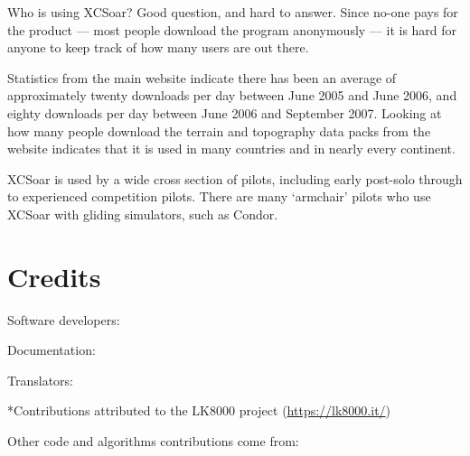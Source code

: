 Who is using XCSoar?  Good question, and hard to answer.  Since no-one
pays for the product --- most people download the program anonymously
--- it is hard for anyone to keep track of how many users are out
there.

Statistics from the main website indicate there has been an average of
approximately twenty downloads per day between June 2005 and June
2006, and eighty downloads per day between June 2006 and September
2007.  Looking at how many people download the terrain and topography
data packs from the website indicates that it is used in many
countries and in nearly every continent.

XCSoar is used by a wide cross section of pilots, including early
post-solo through to experienced competition pilots.  There are many
`armchair' pilots who use XCSoar with gliding simulators, such as
Condor.


\section{Credits}\label{sec:credits}

Software developers:
\begin{itemize}
  
\end{itemize}


Documentation:
\begin{itemize}
  
\end{itemize}


Translators:
\begin{itemize}
  
\end{itemize}
*Contributions attributed to the LK8000 project (\url{https://lk8000.it/})


Other code and algorithms contributions come from:
\begin{description}
  
\end{description}

